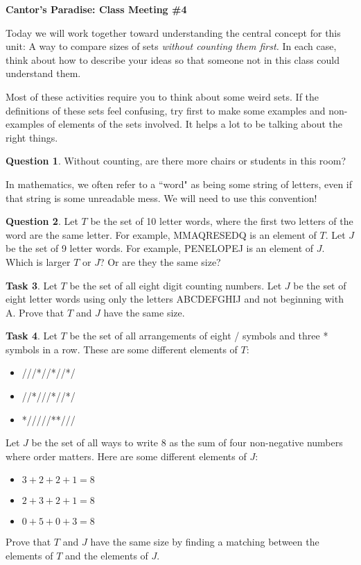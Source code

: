 \documentclass[12pt]{amsart}
\theoremstyle{definition}
\newtheorem{task}{Task}
\newtheorem{question}[task]{Question}
\begin{document}
\begin{center}
\textbf{\Huge
Cantor's Paradise: Class Meeting \#4
}
\end{center}


\vspace{.25in}

Today we will work together toward understanding the central concept for this unit: A way to compare sizes of sets \emph{without counting them first.}
In each case, think about how to describe your ideas so that someone not in this class could understand them.

Most of these activities require you to think about some weird sets.
If the definitions of these sets feel confusing, try first to make some examples and non-examples of elements of the sets involved.
It helps a lot to be talking about the right things.


\begin{question} Without counting, are there more chairs or students in this room?
\end{question}

In mathematics, we often refer to a ``word" as being some string of letters, even if that string is some unreadable mess.
We will need to use this convention!

\begin{question} Let $T$ be the set of 10 letter words, where the first two letters of the word are the same letter.
For example, MMAQRESEDQ is an element of $T$.
Let $J$ be the set of 9 letter words.
For example, PENELOPEJ is an element of $J$.
Which is larger $T$ or $J$?
Or are they the same size?
\end{question}

\begin{task} Let $T$ be the set of all eight digit counting numbers.
Let $J$ be the set of eight letter words using only the letters ABCDEFGHIJ and not beginning with A.
Prove that $T$ and $J$ have the same size.
\end{task}

\begin{task}
Let $T$ be the set of all arrangements of eight / symbols and three * symbols in a row.
These are some different elements of $T$:
\begin{itemize}
\item[] ///*//*//*/
\item[] //*///*//*/
\item[] */////**///
\end{itemize}
Let $J$ be the set of all ways to write $8$ as the sum of four non-negative numbers where order matters.
Here are some different elements of $J$:
\begin{itemize}
\item[] $3+2+2+1=8$
\item[] $2+3+2+1 = 8$
\item[] $0+5+0+3 = 8$
\end{itemize}
Prove that $T$ and $J$ have the same size by finding a matching between the elements of $T$ and the elements of $J$.
\end{task}
\end{document}
